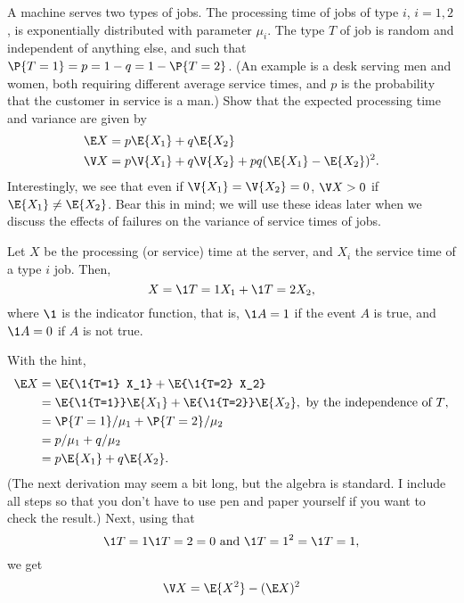\begin{exercise}
  A machine serves two types of jobs. The processing time of jobs of
  type $i$, $i=1,2$, is exponentially distributed with parameter
  $\mu_i$. The type $T$ of job is random and independent of anything
  else, and such that $\P{T=1} = p = 1-q = 1-\P{T=2}$. (An example
  is a desk serving men and women, both requiring different average
  service times, and $p$ is the probability that the customer in
  service is a man.)  Show that  the expected processing time  and  variance are given by
\begin{align*}
  \E X &= p \E{X_1}  + q \E{X_2} \\
\V X &= p \V{X_1} + q \V{X_2} + pq(\E{X_1} - \E{X_2})^2.
  \end{align*}
Interestingly, we see that even if $\V{X_1} = \V{X_2} = 0$, $\V X > 0$
if $\E{X_1} \neq \E{X_2}$. Bear this in mind; we will use these ideas
later when we discuss the effects of failures on the variance of
service times of jobs.
\begin{hint}
    Let $X$ be the processing (or service) time at the server, and
    $X_i$ the service time of a type $i$ job. Then, 
    \begin{equation*}
      X = \1{T=1} X_1 + \1{T=2} X_2,
    \end{equation*}
    where $\1{}$ is the indicator function, that is, $\1{A}=1$ if the
    event $A$ is true, and $\1{A}=0$ if $A$ is not true.   
\end{hint}
  \begin{solution}
With the hint, 
\begin{align*}
  \E X 
&= \E{\1{T=1} X_1} + \E{\1{T=2} X_2} \\
&= \E{\1{T=1}} \E{ X_1} + \E{\1{T=2}} \E{X_2}, \text{ by the independence of $T$}, \\
&= \P{T=1} /\mu_1 + \P{T=2}/ \mu_2 \\
&= p /\mu_1 + q/ \mu_2 \\
&= p \E{X_1}  + q \E{X_2}.
\end{align*}
(The next derivation may seem a bit long, but the algebra is
standard. I include all steps so that you don't have to use pen and
paper yourself if you want to check the result.) Next, using that
\begin{equation*}
\1{T=1}\1{T=2} = 0 \text{ and } \1{T=1}^2 = \1{T=1},
\end{equation*}
we get
\begin{align*}
  \V X 
&= \E{X^2} - (\E X)^2 \\

\end{align*}
\end{solution}
\end{exercise}

